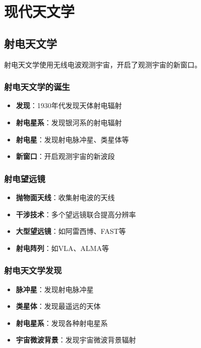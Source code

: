 \documentclass[12pt,UTF8]{ctexbook}
\begin{document}
\chapter{现代天文学}
\section{射电天文学}

射电天文学使用无线电波观测宇宙，开启了观测宇宙的新窗口。

\subsection{射电天文学的诞生}

\begin{itemize}
  \item \textbf{发现}：1930年代发现天体射电辐射
  \item \textbf{射电星系}：发现银河系的射电辐射
  \item \textbf{射电星}：发现射电脉冲星、类星体等
  \item \textbf{新窗口}：开启观测宇宙的新波段
\end{itemize}

\subsection{射电望远镜}

\begin{itemize}
  \item \textbf{抛物面天线}：收集射电波的天线
  \item \textbf{干涉技术}：多个望远镜联合提高分辨率
  \item \textbf{大型望远镜}：如阿雷西博、FAST等
  \item \textbf{射电阵列}：如VLA、ALMA等
\end{itemize}

\subsection{射电天文学发现}

\begin{itemize}
  \item \textbf{脉冲星}：发现射电脉冲星
  \item \textbf{类星体}：发现最遥远的天体
  \item \textbf{射电星系}：发现各种射电星系
  \item \textbf{宇宙微波背景}：发现宇宙微波背景辐射
\end{itemize}
\end{document}
